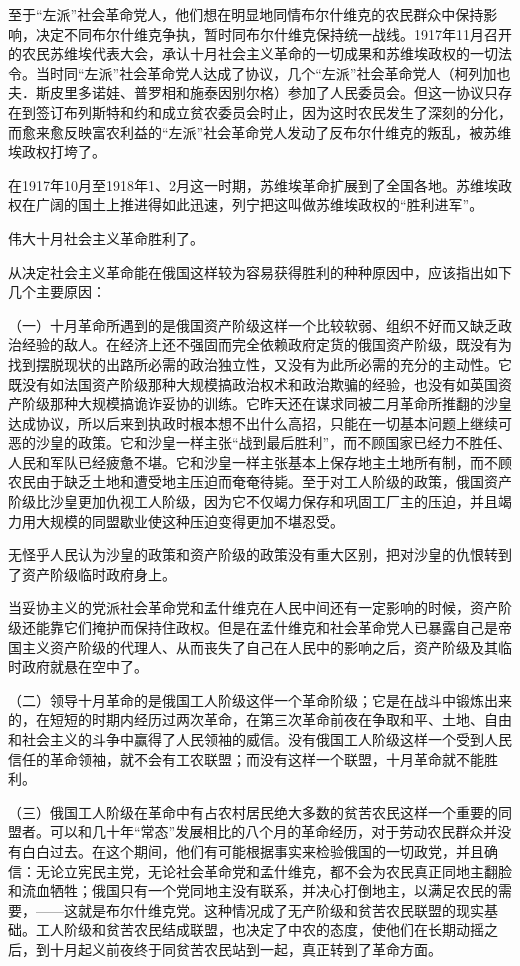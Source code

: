至于“左派”社会革命党人，他们想在明显地同情布尔什维克的农民群众中保持影响，决定不同布尔什维克争执，暂时同布尔什维克保持统一战线。1917年11月召开的农民苏维埃代表大会，承认十月社会主义革命的一切成果和苏维埃政权的一切法令。当时同“左派”社会革命党人达成了协议，几个“左派”社会革命党人（柯列加也夫．斯皮里多诺娃、普罗相和施泰因别尔格）参加了人民委员会。但这一协议只存在到签订布列斯特和约和成立贫农委员会时止，因为这时农民发生了深刻的分化，而愈来愈反映富农利益的“左派”社会革命党人发动了反布尔什维克的叛乱，被苏维埃政权打垮了。

在1917年10月至1918年1、2月这一时期，苏维埃革命扩展到了全国各地。苏维埃政权在广阔的国土上推进得如此迅速，列宁把这叫做苏维埃政权的“胜利进军”。

伟大十月社会主义革命胜利了。

从决定社会主义革命能在俄国这样较为容易获得胜利的种种原因中，应该指出如下几个主要原因：

（一）十月革命所遇到的是俄国资产阶级这样一个比较软弱、组织不好而又缺乏政治经验的敌人。在经济上还不强固而完全依赖政府定货的俄国资产阶级，既没有为找到摆脱现状的出路所必需的政治独立性，又没有为此所必需的充分的主动性。它既没有如法国资产阶级那种大规模搞政治权术和政治欺骗的经验，也没有如英国资产阶级那种大规模搞诡诈妥协的训练。它昨天还在谋求同被二月革命所推翻的沙皇达成协议，所以后来到执政时根本想不出什么高招，只能在一切基本问题上继续可恶的沙皇的政策。它和沙皇一样主张“战到最后胜利”，而不顾国家已经力不胜任、人民和军队已经疲惫不堪。它和沙皇一样主张基本上保存地主土地所有制，而不顾农民由于缺乏土地和遭受地主压迫而奄奄待毙。至于对工人阶级的政策，俄国资产阶级比沙皇更加仇视工人阶级，因为它不仅竭力保存和巩固工厂主的压迫，并且竭力用大规模的同盟歇业使这种压迫变得更加不堪忍受。

无怪乎人民认为沙皇的政策和资产阶级的政策没有重大区别，把对沙皇的仇恨转到了资产阶级临时政府身上。

当妥协主义的党派社会革命党和孟什维克在人民中间还有一定影响的时候，资产阶级还能靠它们掩护而保持住政权。但是在孟什维克和社会革命党人已暴露自己是帝国主义资产阶级的代理人、从而丧失了自己在人民中的影响之后，资产阶级及其临时政府就悬在空中了。

（二）领导十月革命的是俄国工人阶级这伴一个革命阶级；它是在战斗中锻炼出来的，在短短的时期内经历过两次革命，在第三次革命前夜在争取和平、土地、自由和社会主义的斗争中赢得了人民领袖的威信。没有俄国工人阶级这样一个受到人民信任的革命领袖，就不会有工农联盟；而没有这样一个联盟，十月革命就不能胜利。

（三）俄国工人阶级在革命中有占农村居民绝大多数的贫苦农民这样一个重要的同盟者。可以和几十年“常态”发展相比的八个月的革命经历，对于劳动农民群众并没有白白过去。在这个期间，他们有可能根据事实来检验俄国的一切政党，并且确信：无论立宪民主党，无论社会革命党和孟什维克，都不会为农民真正同地主翻脸和流血牺牲；俄国只有一个党同地主没有联系，并决心打倒地主，以满足农民的需要，——这就是布尔什维克党。这种情况成了无产阶级和贫苦农民联盟的现实基础。工人阶级和贫苦农民结成联盟，也决定了中农的态度，使他们在长期动摇之后，到十月起义前夜终于同贫苦农民站到一起，真正转到了革命方面。

